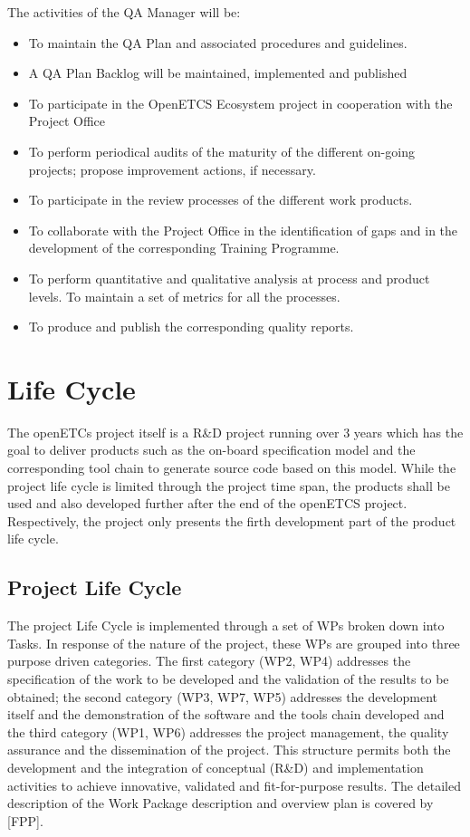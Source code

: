 \documentclass{template/openetcs_article}
\begin{document}
The activities of the QA Manager will be:
\begin{itemize}
\item To maintain the QA Plan and associated procedures and guidelines. 
\item A QA Plan Backlog will be maintained, implemented and published
\item To participate in the OpenETCS Ecosystem project in cooperation with the Project Office
\item To perform periodical audits of the maturity of the different on-going projects; propose improvement actions, if necessary.
\item To participate in the review processes of the different work products.
\item To collaborate with the Project Office in the identification of gaps and in the development of the corresponding Training Programme.
\item To perform quantitative and qualitative analysis at process and product levels. To maintain a set of metrics for all the processes.
\item To produce and publish the corresponding quality reports.
\end{itemize}


\newpage
\section{Life Cycle}

The openETCs project itself is a R\&D project running over 3 years which has the goal to deliver products such as the on-board specification model and the corresponding tool chain to generate source code based on this model. While the project life cycle is limited through the project time span, the products shall be used and also developed further after the end of the openETCS project. Respectively, the project only presents the firth development part of the product life cycle.

\subsection{Project Life Cycle }

The project Life Cycle is implemented through a set of WPs broken down into Tasks. In response of the nature of the project, these WPs are grouped into three purpose driven categories. The first category (WP2, WP4) addresses the specification of the work to be developed and the validation of the results to be obtained; the second category (WP3, WP7, WP5) addresses the development itself and the demonstration of the software and the tools chain developed and the third category (WP1, WP6) addresses the project management, the quality assurance and the dissemination of the project.
This structure permits both the development and the integration of conceptual (R\&D) and implementation activities to achieve innovative, validated and fit-for-purpose results.
The detailed description of the Work Package description and overview plan is covered by [FPP].  
\end{document}

